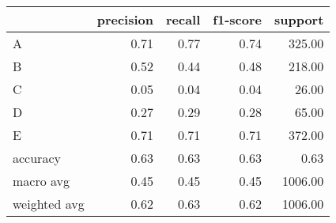 \begin{tabular}{|l|r|r|r|r|}
\hline
{} &  precision &  recall &  f1-score &  support \\
\hline
A            &       0.71 &    0.77 &      0.74 &   325.00 \\
B            &       0.52 &    0.44 &      0.48 &   218.00 \\
C            &       0.05 &    0.04 &      0.04 &    26.00 \\
D            &       0.27 &    0.29 &      0.28 &    65.00 \\
E            &       0.71 &    0.71 &      0.71 &   372.00 \\
accuracy     &       0.63 &    0.63 &      0.63 &     0.63 \\
macro avg    &       0.45 &    0.45 &      0.45 &  1006.00 \\
weighted avg &       0.62 &    0.63 &      0.62 &  1006.00 \\
\hline
\end{tabular}
